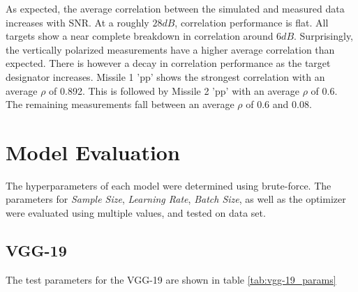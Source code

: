 	As expected, the average correlation between the simulated and measured data increases with SNR. At a roughly $28 dB$, correlation performance is flat. All targets show a near complete breakdown in correlation around $6 dB$. Surprisingly, the vertically polarized measurements have a higher average correlation than expected. There is however a decay in correlation performance as the target designator increases. Missile 1 'pp' shows the strongest correlation with an average $\rho$ of 0.892. This is followed by Missile 2 'pp' with an average $\rho$ of 0.6. The remaining measurements fall between an average $\rho$ of 0.6 and 0.08.



\section{Model Evaluation}

	The hyperparameters of each model were determined using brute-force. The parameters for \textit{Sample Size}, \textit{Learning Rate}, \textit{Batch Size}, as well as the optimizer were evaluated using multiple values, and tested on data set.

	\subsection{VGG-19}

		The test parameters for the VGG-19 are shown in table \ref{tab:vgg-19_params}

